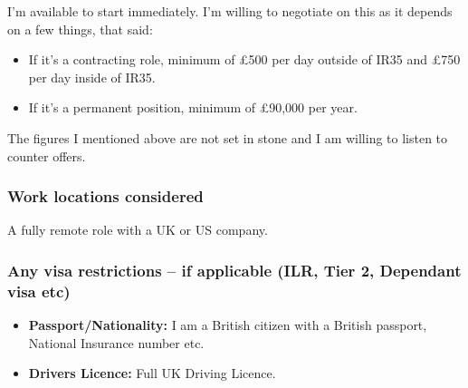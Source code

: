 \documentclass[
  a4paper,
]{article}
\providecommand{\tightlist}{%
  \setlength{\itemsep}{0pt}\setlength{\parskip}{0pt}}
\begin{document}
I'm available to start immediately. I'm willing to negotiate on this as
it depends on a few things, that said:

\begin{itemize}
\tightlist
\item
  If it's a contracting role, minimum of £500 per day outside of IR35
  and £750 per day inside of IR35.
\item
  If it's a permanent position, minimum of £90,000 per year.
\end{itemize}

The figures I mentioned above are not set in stone and I am willing to
listen to counter offers.

\hypertarget{work-locations-considered}{%
\subsubsection{Work locations
considered}\label{work-locations-considered}}

A fully remote role with a UK or US company.

\hypertarget{any-visa-restrictions-if-applicable-ilr-tier-2-dependant-visa-etc}{%
\subsubsection{Any visa restrictions -- if applicable (ILR, Tier 2,
Dependant visa
etc)}\label{any-visa-restrictions-if-applicable-ilr-tier-2-dependant-visa-etc}}

\begin{itemize}
\tightlist
\item
  \textbf{Passport/Nationality:} I am a British citizen with a British
  passport, National Insurance number etc.
\item
  \textbf{Drivers Licence:} Full UK Driving Licence.
\end{itemize}
\end{document}
